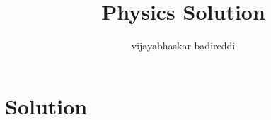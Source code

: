 \documentclass[12pt]{article}
\title{Physics Solution}
\author{vijayabhaskar badireddi}
\date{}
\begin{document}

\section{Solution}
\end{document}
